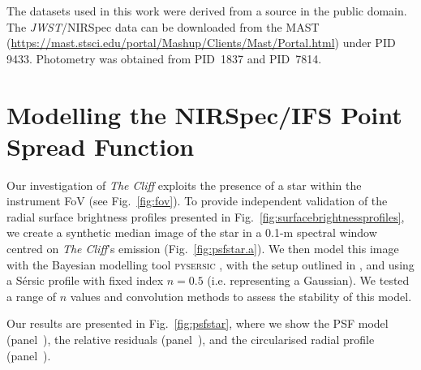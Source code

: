 \documentclass[fleqn,usenatbib]{mnras}
\newcommand{\jwst}{\textit{JWST}\xspace}
\newcommand{\cliff}{\textit{The Cliff}\xspace}
\begin{document}
The datasets used in this work were derived from a source in the public domain. The \jwst/NIRSpec data can be downloaded from the MAST (\url{https://mast.stsci.edu/portal/Mashup/Clients/Mast/Portal.html}) under PID 9433. Photometry was obtained from PID~1837 and PID~7814.
  











\appendix

\section{Modelling the NIRSpec/IFS Point Spread Function}\label{sec:IFSPSF}

Our investigation of \cliff exploits the presence of a star within the instrument FoV (see Fig.~\ref{fig:fov}). To provide independent validation of the radial surface brightness profiles presented in Fig.~\ref{fig:surfacebrightnessprofiles}, we create a synthetic median image of the star in a 0.1-\textmu m spectral window centred on \cliff's \OIIIL emission (Fig.~\ref{fig:psfstar.a}). We then model this image with the Bayesian modelling tool \textsc{pysersic} \citep{PashaMiller2023}, with the setup outlined in \citet{DEugenio2026}, and using a S\'ersic profile with fixed index $n=0.5$ (i.e. representing a Gaussian). We tested a range of $n$ values and convolution methods to assess the stability of this model.

Our results are presented in Fig.~\ref{fig:psfstar}, where we show the PSF model (panel~), the relative residuals (panel~), and the circularised radial profile (panel~).
\end{document}
